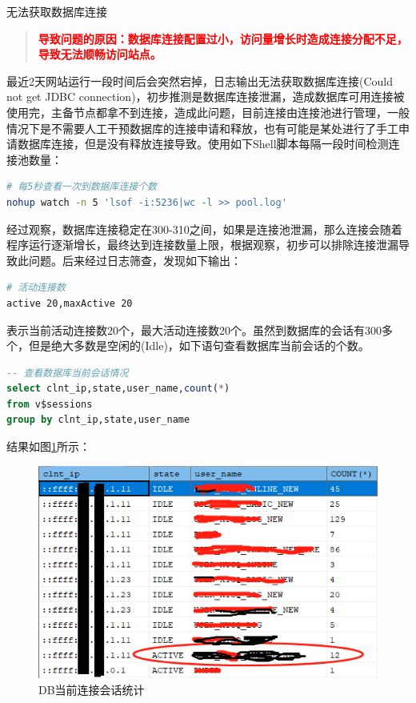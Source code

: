 \documentclass[8pt]{book}
\makeatletter
\numberwithin{dummy}{section}
\theoremstyle{ocrenumbox}
\theoremstyle{blacknumex}
\theoremstyle{blacknumbox}
\theoremstyle{ocrenum}
\renewcommand{\subsection}{\@startsection {subsection}{2}{\z@}
	{-3ex \@plus -0.1ex \@minus -.4ex}
	{0.5ex \@plus.2ex }
	{\normalfont\sffamily\bfseries}}
\makeatother
\begin{document}
\subsection{无法获取数据库连接}

\begin{quote}
	\textbf{\textcolor{red}{导致问题的原因：数据库连接配置过小，访问量增长时造成连接分配不足，导致无法顺畅访问站点。}}
\end{quote}

最近2天网站运行一段时间后会突然宕掉，日志输出无法获取数据库连接(Could not get JDBC connection)，初步推测是数据库连接泄漏，造成数据库可用连接被使用完，主备节点都拿不到连接，造成此问题，目前连接由连接池进行管理，一般情况下是不需要人工干预数据库的连接申请和释放，也有可能是某处进行了手工申请数据库连接，但是没有释放连接导致。使用如下Shell脚本每隔一段时间检测连接池数量：

\begin{lstlisting}[language=Bash]
# 每5秒查看一次到数据库连接个数
nohup watch -n 5 'lsof -i:5236|wc -l >> pool.log'
\end{lstlisting}

经过观察，数据库连接稳定在300-310之间，如果是连接池泄漏，那么连接会随着程序运行逐渐增长，最终达到连接数量上限，根据观察，初步可以排除连接泄漏导致此问题。后来经过日志筛查，发现如下输出：

\begin{lstlisting}[language=Bash]
# 活动连接数
active 20,maxActive 20
\end{lstlisting}

表示当前活动连接数20个，最大活动连接数20个。虽然到数据库的会话有300多个，但是绝大多数是空闲的(Idle)，如下语句查看数据库当前会话的个数。

\begin{lstlisting}[language=SQL]
-- 查看数据库当前会话情况
select clnt_ip,state,user_name,count(*)
from v$sessions
group by clnt_ip,state,user_name
\end{lstlisting}

结果如图\ref{fig:sessionstatistics}所示：

\begin{figure}[htbp]
	\centering
	\includegraphics[scale=0.6]{sessionstatistics.png}
	\caption{DB当前连接会话统计}
	\label{fig:sessionstatistics}
\end{figure}
\end{document}
